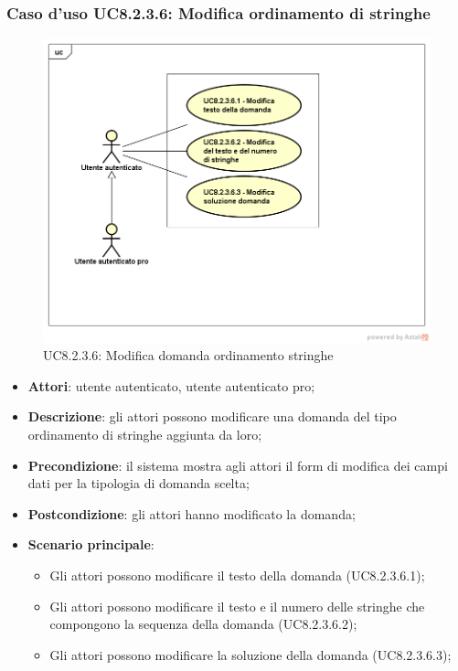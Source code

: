 \subsubsection{Caso d’uso UC8.2.3.6: Modifica ordinamento di stringhe}
	\label{UC8.2.3.6}
	\begin{figure}[h]
		\centering
		\includegraphics[scale=0.45,keepaspectratio]{UML/UC8_2_3_6.png}
		\caption{UC8.2.3.6: Modifica domanda ordinamento stringhe}
	\end{figure}
	\FloatBarrier
\begin{itemize}
	\item\textbf{Attori}: utente autenticato, utente autenticato pro;
	\item\textbf{Descrizione}: gli attori possono modificare una domanda del tipo ordinamento di stringhe aggiunta da loro;
	\item\textbf{Precondizione}: il sistema mostra agli attori il form di modifica dei campi dati per la tipologia di domanda scelta; 
	\item \textbf{Postcondizione}: gli attori hanno modificato la domanda;
	\item\textbf{Scenario principale}:
		\begin{itemize}
			\item Gli attori possono modificare il testo della domanda (UC8.2.3.6.1);
			\item Gli attori possono modificare il testo e il numero delle stringhe che compongono la sequenza della domanda (UC8.2.3.6.2);
			\item Gli attori possono modificare la soluzione della domanda (UC8.2.3.6.3); 
		\end{itemize}
\end{itemize}

